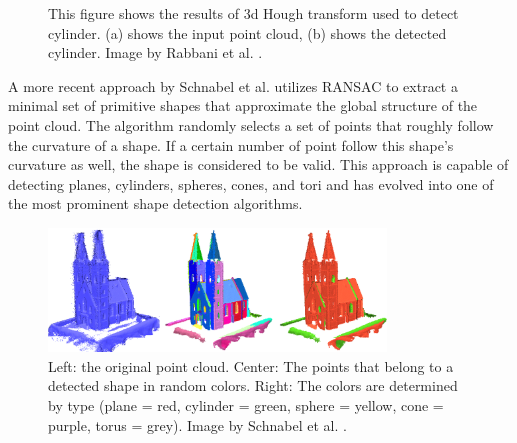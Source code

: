 \begin{figure}
\centering
{}
\caption{This figure shows the results of 3d Hough transform used to detect cylinder. (a) shows the input point cloud, (b) shows the detected cylinder. Image by Rabbani et al. \cite{rabbani2005efficient}.}
\label{fig:hough_cylinder}
\end{figure}


A more recent approach by Schnabel et al. \cite{schnabel-2007-efficient} utilizes RANSAC\cite{fischler1981random} to extract a minimal set of primitive shapes that approximate the global structure of the point cloud. The algorithm randomly selects a set of points that roughly follow the curvature of a shape. If a certain number of point follow this shape's curvature as well, the shape is considered to be valid. This approach is capable of detecting planes, cylinders, spheres, cones, and tori and has evolved into one of the most prominent shape detection algorithms. 

\begin{figure}
    \centering
    \includegraphics[width=0.8\textwidth]{Related_Work/schnabel_example.png}%
    \caption{Left: the original point cloud. Center: The points that belong to a detected shape in random colors. Right: The colors are determined by type (plane = red, cylinder = green, sphere = yellow, cone = purple, torus = grey). Image by Schnabel et al. \cite{schnabel-2007-efficient}. }
    \label{fig:schnabel_church}
\end{figure}

